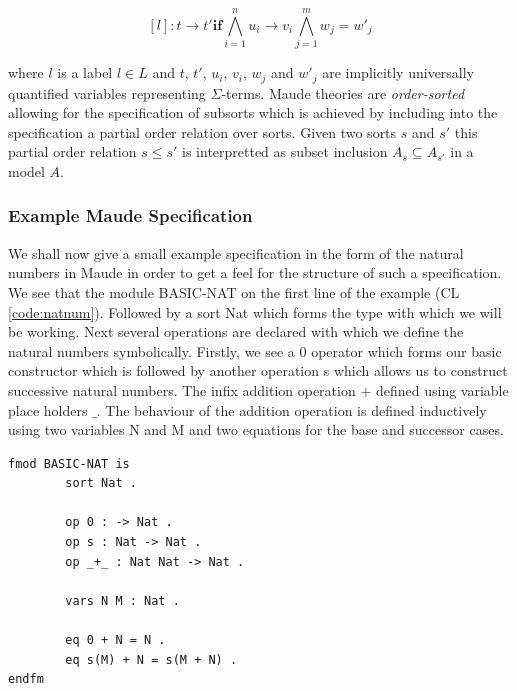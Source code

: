 $$ [l] : t \to t' \mathbf{if} \bigwedge^{n}_{i = 1} u_i \to v_i \bigwedge^{m}_{j = 1} w_j = w'_j $$

where $l$ is a label $l \in L$ and $t$, $t'$, $u_i$, $v_i$, $w_j$ and $w'_j$ are implicitly universally quantified variables representing $\Sigma$-terms. Maude theories are \emph{order-sorted} allowing for the specification of subsorts which is achieved by including into the specification a partial order relation over sorts. Given two sorts $s$ and $s'$ this partial order relation $s \leq s'$ is interpretted as subset inclusion $A_s \subseteq A_{s'}$ in a model $A$.


\begin{mydef}


\end{mydef}

\subsubsection{Example Maude Specification}
We shall now give a small example specification in the form of the natural numbers in Maude in order to get a feel for the structure of such a specification. We see that the module BASIC-NAT on the first line of the example (CL \ref{code:natnum}). Followed by a sort Nat which forms the type with which we will be working. Next several operations are declared with which we define the natural numbers symbolically. Firstly, we see a 0 operator which forms our basic constructor which is followed by another operation s which allows us to construct successive natural numbers. The infix addition operation $+$ defined using variable place holders  $\_$. The behaviour of the addition operation is defined inductively using two variables N and M and two equations for the base and successor cases.

\begin{lstlisting}[caption = The natural numbers in Maude, label = code:natnum]
fmod BASIC-NAT is
        sort Nat .

        op 0 : -> Nat .
        op s : Nat -> Nat .
        op _+_ : Nat Nat -> Nat .

        vars N M : Nat .

        eq 0 + N = N .
        eq s(M) + N = s(M + N) .
endfm
\end{lstlisting}



